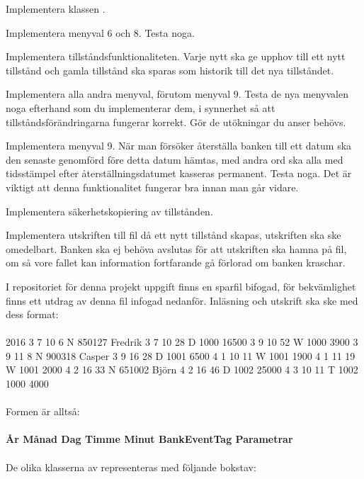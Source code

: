\Task Implementera klassen .

\Subtask Implementera menyval 6 och 8. Testa noga.

\Subtask Implementera tillståndsfunktionaliteten. Varje nytt  ska ge upphov till ett nytt tillstånd och gamla tillstånd ska sparas som historik till det nya tillståndet.

\Subtask Implementera alla andra menyval, förutom menyval 9. Testa de nya menyvalen noga efterhand som du implementerar dem, i synnerhet så att tillståndsförändringarna fungerar korrekt. Gör de utökningar du anser behövs.

\Task Implementera menyval 9. När man försöker återställa banken till ett datum ska den senaste  genomförd före detta datum hämtas, med andra ord ska alla  med tidsstämpel efter återställningsdatumet kasseras permanent. Testa noga. Det är viktigt att denna funktionalitet fungerar bra innan man går vidare.

\Task Implementera säkerhetskopiering av tillstånden.

\Subtask Implementera utskriften till fil då ett nytt tillstånd skapas, utskriften ska ske omedelbart. Banken ska ej behöva avslutas för att utskriften ska hamna på fil, om så vore fallet kan information fortfarande gå förlorad om banken kraschar.

I repositoriet för denna projekt uppgift finns en sparfil bifogad, för bekvämlighet finns ett utdrag av denna fil  infogad nedanför. Inläsning och utskrift ska ske med dess format:\\~\\
2016 3 7 10 6 N 850127 Fredrik 3 7 10 28 D 1000 16500 3 9 10 52 W 1000 3900 3 9 11 8 N 900318 Casper 3 9 16 28 D 1001 6500 4 1 10 11 W 1001 1900 4 1 11 19 W 1001 2000 4 2 16 33 N 651002 Björn 4 2 16 46 D 1002 25000 4 3 10 11 T 1002 1000 4000\\~\\
Formen är alltså:\\~\\
\textbf{År  Månad  Dag  Timme  Minut  BankEventTag  Parametrar}
\\~\\
De olika klasserna av  representeras med följande bokstav:

